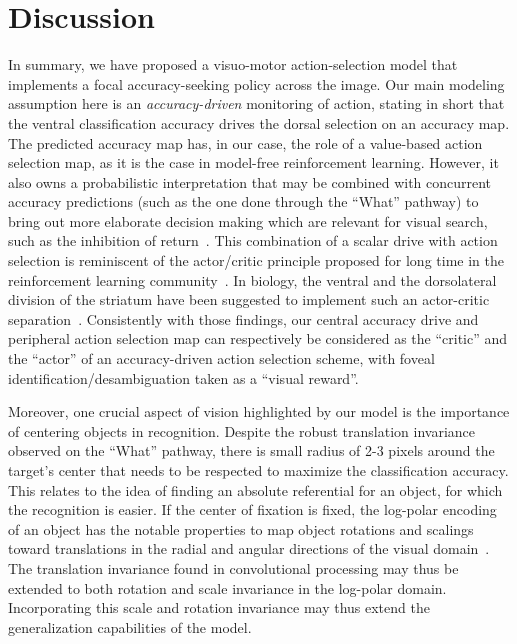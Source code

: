 
\section{Discussion} \label{sec:discussion}

In summary, we have proposed a visuo-motor action-selection model that implements a focal accuracy-seeking policy across the image. 
Our main modeling assumption here is an \emph{accuracy-driven} monitoring of action, stating in short that the ventral classification accuracy drives the dorsal selection on an accuracy map. 
The predicted accuracy map has, in our case, the role of a value-based action selection map, as it is the case in model-free reinforcement learning. However, it also owns a probabilistic interpretation that may be combined with concurrent accuracy predictions (such as the one done through the ``What'' pathway) to bring out more elaborate decision making which are relevant for visual search, such as the inhibition of return~\cite{Itti01}. This combination of a scalar drive with action selection is reminiscent of the actor/critic principle proposed for long time in the reinforcement learning community~\cite{sutton1998reinforcement}. In biology, the ventral and the dorsolateral division of the striatum have been suggested to implement such an actor-critic separation~\cite{joel2002actor,takahashi2008silencing}. Consistently with those findings, our central accuracy drive and peripheral action selection map can respectively be considered as the ``critic'' and the ``actor'' of an accuracy-driven action selection scheme, with foveal identification/desambiguation taken as a ``visual reward''.

Moreover, one crucial aspect of vision highlighted by our model is the importance of centering objects in recognition. Despite the robust translation invariance observed on the ``What'' pathway, there is small radius of 2-3 pixels around the target's center that needs to be respected to maximize the classification accuracy. This relates to the idea of finding an absolute referential for an object, for which the recognition is easier. If the center of fixation is fixed, the log-polar encoding of an object has the notable properties to map object rotations and scalings toward translations in the radial and angular directions of the visual domain~\cite{Traver10}. The translation invariance found in convolutional processing may thus be extended to both rotation and scale invariance in the log-polar domain. Incorporating this scale and rotation invariance may thus extend the generalization capabilities of the model.



